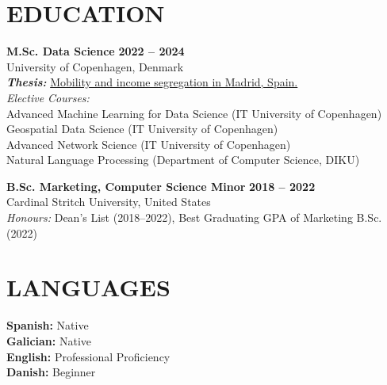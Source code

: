 \documentclass{resume}
\begin{document}
\section{EDUCATION} 
\begin{content}
    {\bf M.Sc. Data Science} \hfill {\bf 2022 -- 2024} \\
    University of Copenhagen, Denmark \\
    {\bf \em Thesis:} {\href{https://carobs9.github.io/segregation-mobility/}{Mobility and income segregation in Madrid, Spain.}} \\ 
    {\em Elective Courses:} \\
    {\small
    Advanced Machine Learning for Data Science (IT University of Copenhagen) \\ 
    Geospatial Data Science (IT University of Copenhagen) \\
    Advanced Network Science (IT University of Copenhagen) \\
    Natural Language Processing (Department of Computer Science, DIKU) \\
    }


    {\bf B.Sc. Marketing, Computer Science Minor} \hfill {\bf 2018 -- 2022} \\
    Cardinal Stritch University, United States \\
    {\em Honours:} Dean's List (2018--2022), Best Graduating GPA of Marketing B.Sc. (2022)
\end{content}

\section{LANGUAGES} 
\begin{content}
    {\bf Spanish:} Native \\
    {\bf Galician:} Native \\
    {\bf English:} Professional Proficiency  \\
    {\bf Danish:} Beginner \\
\end{content}

\end{document}
